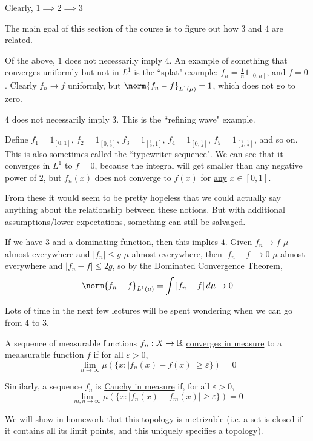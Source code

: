\documentclass[x11names,reqno,14pt]{extarticle}
\newcommand*{\oo}{\infty}
\begin{document}
Clearly, $1\implies2\implies3$

The main goal of this section of the course is to figure out how $3$ and $4$ are related. 

\exm

Of the above, $1$ does not necessarily imply $4$. An example of something that converges uniformly but not in $L^1$ is the ``splat" example: $f_n = \frac{1}{n}1_[0, n]$, and $f = 0$. Clearly $f_n \to f$ uniformly, but $\norm{f_n - f}_{L^1(\mu)} = 1$, which does not go to zero. 

\exm

$4$ does not necessarily imply $3$. This is the ``refining wave" example. 

Define $f_1 = 1_{[0, 1]}$, $f_2 = 1_{[0, \frac{1}{2}]}$, $f_3 = 1_{[\frac{1}{2}, 1]}$, $f_4 = 1_{[0, \frac{1}{4}]}$, $f_5 = 1_{[\frac{1}{4}, \frac{1}{2}]}$, and so on. This is also sometimes called the ``typewriter sequence". We can see that it converges in $L^1$ to $f = 0$, because the integral will get smaller than any negative power of $2$, but $f_n(x)$ does not converge to $f(x)$ for \underline{any} $x \in [0, 1]$. 

From these it would seem to be pretty hopeless that we could actually say anything about the relationship between these notions. But with additional assumptions/lower expectations, something can still be salvaged. 

\exm

If we have $3$ and a dominating function, then this implies $4$. Given $f_n \to f$ $\mu$-almost everywhere and $|f_n| \leq g$ $\mu$-almost everywhere, then $|f_n - f| \to 0$ $\mu$-almost everywhere and $|f_n - f| \leq 2g$, so by the Dominated Convergence Theorem, 
\[
\norm{f_n - f}_{L^1(\mu)} = \int|f_n - f|\,d\mu \to 0
\]

Lots of time in the next few lectures will be spent wondering when we can go from $4$ to $3$. 


A sequence of measurable functions $f_n:X\to\mathbb{R}$ \underline{converges in measure} to a meaasurable function $f$ if for all $\varepsilon>0$, 
\[
\lim_{n\to\oo}\mu(\{x : |f_n(x) - f(x)| \geq \varepsilon\}) = 0
\]

Similarly, a sequence $f_n$ is \underline{Cauchy in measure} if, for all $\varepsilon>0$, 
\[
\lim_{m, n\to\oo}\mu(\{x : |f_n(x) - f_m(x)|\geq\varepsilon\}) = 0
\]

\rem

We will show in homework that this topology is metrizable (i.e. a set is closed if it contains all its limit points, and this uniquely specifies a topology). 
\end{document}
